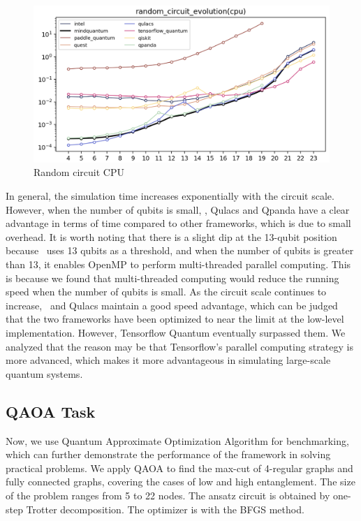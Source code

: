 \begin{figure}[htbp]
    \begin{center}
        \includegraphics[width=0.7\linewidth]{7_figures/random_circuit_CPU.png}
    \end{center}
    \caption{Random circuit CPU}
\end{figure}

In general, the simulation time increases exponentially with the circuit scale. However, when the number of qubits is small, \MindQuantum, Qulacs and Qpanda have a clear advantage in terms of time compared to other frameworks, which is due to small overhead. It is worth noting that there is a slight dip at the 13-qubit position because \MindQuantum\ uses 13 qubits as a threshold, and when the number of qubits is greater than 13, it enables OpenMP to perform multi-threaded parallel computing. This is because we found that multi-threaded computing would reduce the running speed when the number of qubits is small. As the circuit scale continues to increase, \MindQuantum\ and Qulacs maintain a good speed advantage, which can be judged that the two frameworks have been optimized to near the limit at the low-level implementation. However, Tensorflow Quantum eventually surpassed them. We analyzed that the reason may be that Tensorflow’s parallel computing strategy is more advanced, which makes it more advantageous in simulating large-scale quantum systems.

\subsection{QAOA Task}

Now, we use Quantum Approximate Optimization Algorithm for benchmarking, which can further demonstrate the performance of the framework in solving practical problems. We apply QAOA to find the max-cut of 4-regular graphs and fully connected graphs, covering the cases of low and high entanglement. The size of the problem ranges from 5 to 22 nodes. The ansatz circuit is obtained by one-step Trotter decomposition. The optimizer is  with the BFGS method.


